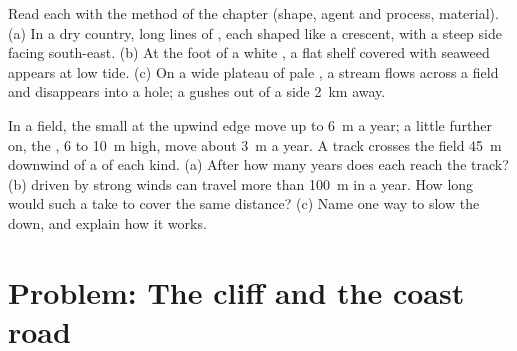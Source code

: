 \begin{exercise}[$\star\star\star$]\label{exo:g9:landforms:11}
Read each  with the method of the chapter (shape, agent and
process, material). (a) In a dry country, long lines of  , each
shaped like a crescent, with a steep side facing south-east. (b) At the
foot of a white , a flat  shelf covered with seaweed appears at
low tide. (c) On a wide plateau of pale , a stream flows across a field
and disappears into a hole; a  gushes out of a  side
\qty{2}{km} away.
\end{exercise}

\begin{exercise}[$\star\star\star$]\label{exo:g9:landforms:12}
In a  field, the small  at the upwind edge move up to \qty{6}{m} a
year; a little further on, the , 6 to \qty{10}{m} high, move about
\qty{3}{m} a year. A track crosses the field \qty{45}{m} downwind of a 
of each kind. (a) After how many years does each  reach the track?
(b)  driven by strong winds can travel more than \qty{100}{m} in a
year. How long would such a  take to cover the same distance? (c) Name
one way to slow the  down, and explain how it works.
\end{exercise}

\section{Problem: The cliff and the coast road}

